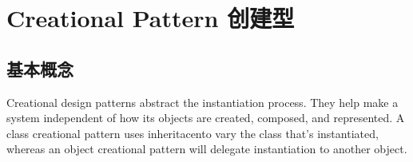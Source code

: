 \chapter{Creational Pattern 创建型}

\section{基本概念}
Creational design patterns abstract the instantiation process. They help make a
system independent of how its objects are created, composed, and represented. A
class creational pattern uses inheritacento vary the class that's instantiated,
 whereas an object creational pattern will delegate instantiation to another object.






